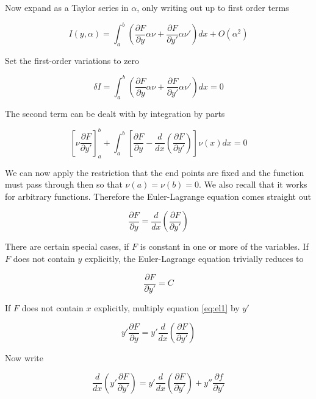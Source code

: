 \documentclass{tufte-book}
\newcommand{\pfrac}[2]{\frac{\partial {#1} }{\partial {#2} }}
\begin{document}
Now expand as a Taylor series in $\alpha$, only writing out up to first order terms

\begin{equation}
	\label{eq:5}
	I(y,\alpha) = \int^b_a\left(\pfrac{F}{y}\alpha\nu + \pfrac{F}{y'}\alpha\nu'\right)dx + O(\alpha^2)
\end{equation}

Set the first-order variations to zero

\begin{equation}
	\label{eq:6}
	\delta I = \int^b_a \left(\pfrac{F}{y}\alpha\nu + \pfrac{F}{y'}\alpha\nu'\right)dx = 0
\end{equation}

The second term can be dealt with by integration by parts

\begin{equation}
	\label{eq:7}
	\left[\nu\pfrac{F}{y'}\right]^b_a + \int^b_a\left[\pfrac{F}{y} - \frac{d}{dx}\left(\pfrac{F}{y'}\right)\right]\nu(x)dx = 0
\end{equation}

We can now apply the restriction that the end points are fixed and the function must pass through then so that $\nu(a) = \nu(b) = 0$. We also recall that it works for arbitrary functions. Therefore the Euler-Lagrange equation comes straight out

\begin{equation}
	\label{eq:el1}
	\pfrac{F}{y} = \frac{d}{dx}\left(\pfrac{F}{y'}\right)
\end{equation}

There are certain special cases, if $F$ is constant in one or more of the variables. If $F$ does not contain $y$ explicitly, the Euler-Lagrange equation trivially reduces to

\begin{equation}
	\label{eq:el2}
	\pfrac{F}{y'} = C
\end{equation}

If $F$ does not contain $x$ explicitly, multiply equation \ref{eq:el1} by $y'$

\begin{equation}
	\label{eq:8}
	y'\pfrac{F}{y} = y'\frac{d}{dx}\left(\pfrac{F}{y'}\right)
\end{equation}

Now write

\begin{equation}
	\label{eq:9}
	\frac{d}{dx}\left(y'\pfrac{F}{y'}\right) = y'\frac{d}{dx}\left(\pfrac{F}{y'}\right) + y''\pfrac{f}{y'}
\end{equation}
\end{document}
